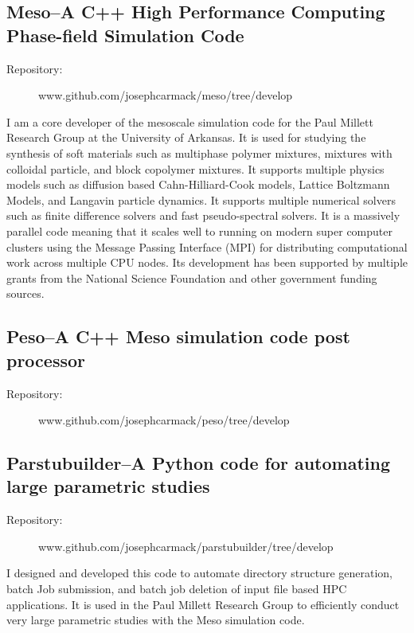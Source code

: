 \documentclass[10pt]{article}
\begin{document}
\subsection{Meso--A C++ High Performance Computing Phase-field Simulation Code}
\begin{description}
    \item[Repository:] www.github.com/josephcarmack/meso/tree/develop
\end{description}
I am a core developer of the mesoscale simulation code for the Paul Millett
Research Group at the University of Arkansas. It is used for studying the
synthesis of soft materials such as multiphase polymer mixtures, mixtures with
colloidal particle, and block copolymer mixtures. It supports multiple physics
models such as diffusion based Cahn-Hilliard-Cook models, Lattice Boltzmann
Models, and Langavin particle dynamics. It supports multiple numerical solvers
such as finite difference solvers and fast pseudo-spectral solvers. It is a
massively parallel code meaning that it scales well to running on modern super
computer clusters using the Message Passing Interface (MPI) for distributing
computational work across multiple CPU nodes. Its development has been
supported by multiple grants from the National Science Foundation and other
government funding sources.

\subsection{Peso--A C++ Meso simulation code post processor}
\begin{description}
    \item[Repository:] www.github.com/josephcarmack/peso/tree/develop
\end{description}

\subsection{Parstubuilder--A Python code for automating large parametric studies}
\begin{description}
    \item[Repository:] www.github.com/josephcarmack/parstubuilder/tree/develop
\end{description}
I designed and developed this code to automate directory structure generation,
batch Job submission, and batch job deletion of input file based HPC
applications. It is used in the Paul Millett Research Group to efficiently
conduct very large parametric studies with the Meso simulation code.
\end{document}
